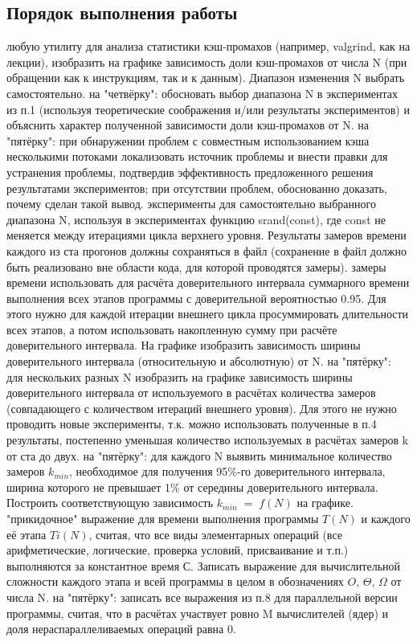 { %
	\subsection{Порядок выполнения работы}
	\begin{enumerate}
		 любую утилиту для анализа статистики кэш-промахов (например, valgrind, как на лекции), изобразить на графике зависимость доли кэш-промахов от числа N (при обращении как к инструкциям, так и к данным). Диапазон изменения N выбрать самостоятельно. 
		 на "четвёрку": обосновать выбор диапазона N в экспериментах из п.1 (используя теоретические соображения и/или результаты экспериментов) и объяснить характер полученной зависимости доли кэш-промахов от N.
		 на "пятёрку": при обнаружении проблем с совместным использованием кэша несколькими потоками локализовать источник проблемы и внести правки для устранения проблемы, подтвердив эффективность предложенного решения результатами экспериментов; при отсутствии проблем, обоснованно доказать, почему сделан такой вывод.
		 эксперименты для самостоятельно выбранного диапазона N, используя в экспериментах функцию srand(const), где const не меняется между итерациями цикла верхнего уровня. Результаты замеров времени каждого из ста прогонов должны сохраняться в файл (сохранение в файл должно быть реализовано вне области кода, для которой проводятся замеры).
		 замеры времени использовать для расчёта доверительного интервала суммарного времени выполнения всех этапов программы с доверительной вероятностью 0.95. Для этого нужно для каждой итерации внешнего цикла просуммировать длительности всех этапов, а потом использовать накопленную сумму при расчёте доверительного интервала. На графике изобразить зависимость ширины доверительного интервала (относительную и абсолютную) от N. 
		 на "пятёрку": для нескольких разных N изобразить на графике зависимость ширины доверительного интервала от используемого в расчётах количества замеров (совпадающего с количеством итераций внешнего уровня). Для этого не нужно проводить новые эксперименты, т.к. можно использовать  полученные в п.4 результаты, постепенно уменьшая количество используемых в расчётах замеров k от ста до двух.
		 на "пятёрку": для каждого N выявить минимальное количество замеров $k_{min}$, необходимое для получения 95\%-го доверительного интервала, ширина которого не превышает 1\% от  середины доверительного интервала. Построить соответствующую зависимость $k_{min}\;=\;f(N)$ на графике.
		 "прикидочное" выражение для времени выполнения программы $T(N)$ и каждого её этапа $Ti(N)$, считая, что все виды элементарных операций (все арифметические, логические, проверка условий, присваивание и т.п.) выполняются за константное время С. Записать выражение для вычислительной сложности каждого этапа и всей программы в целом в обозначениях $O$, $\Theta$, $\Omega$ от числа N. 
		 на "пятёрку": записать все выражения из п.8 для параллельной версии программы, считая, что в расчётах участвует ровно M вычислителей (ядер) и доля нераспараллеливаемых операций равна 0.
	\end{enumerate}
}